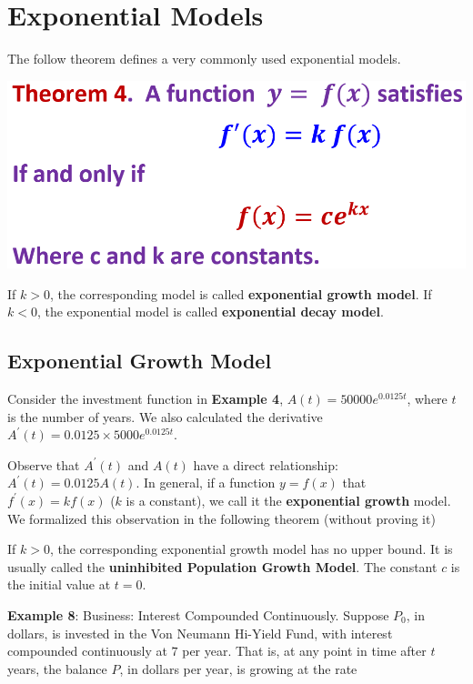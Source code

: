 \documentclass[
]{book}
\begin{document}
\hfill\break

\hypertarget{exponential-models}{%
\section{Exponential Models}\label{exponential-models}}

The follow theorem defines a very commonly used exponential models.

\hfill\break

\begin{center}\includegraphics[width=0.6\linewidth]{img05/w05-ExponentialGrowthModel} \end{center}

\hfill\break

If \(k > 0\), the corresponding model is called \textbf{exponential growth model}. If \(k < 0\), the exponential model is called \textbf{exponential decay model}.

\hypertarget{exponential-growth-model}{%
\subsection{Exponential Growth Model}\label{exponential-growth-model}}

Consider the investment function in \textbf{Example 4}, \(A(t) = 50000e^{0.0125t}\), where \(t\) is the number of years. We also calculated the derivative \(A^\prime(t) =0.0125 \times 5000e^{0.0125t}\).

Observe that \(A^\prime(t)\) and \(A(t)\) have a direct relationship: \(A^\prime(t) = 0.0125A(t)\). In general, if a function \(y = f(x)\) that \(f^\prime(x) = k f(x)\) (\(k\) is a constant), we call it the \textbf{exponential growth} model. We formalized this observation in the following theorem (without proving it)

If \(k > 0\), the corresponding exponential growth model has no upper bound. It is usually called the \textbf{uninhibited Population Growth Model}. The constant \(c\) is the initial value at \(t = 0\).

\hfill\break

\textbf{Example 8}: Business: Interest Compounded Continuously. Suppose \(P_0\), in dollars, is invested in the Von Neumann Hi-Yield Fund, with interest compounded continuously at \(7%
\) per year. That is, at any point in time after \(t\) years, the balance \(P\), in dollars per year, is growing at the rate
\end{document}
